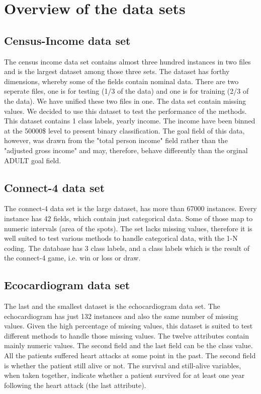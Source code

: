 \documentclass[a4paper]{article}
\begin{document}
\section{Overview of the data sets}
\subsection{Census-Income data set}
The census income data set contains almost three hundred instances in two files
and is the largest dataset among those three sets. The dataset has forthy
dimensions, whereby some of the fields contain nominal data. There are two
seperate files, one is for testing (1/3 of the data) and one is for training (2/3
of the data). We have unified these two files in one. The data set contain
missing values. We decided to use this dataset to test the performance of the
methods. This dataset contains 1 class labels, yearly income. The income have
been binned at the 50000\$ level to present binary classification. The goal field
of this data, however, was drawn from the "total person income" field rather
than the "adjusted gross income" and may, therefore, behave differently than the
orginal ADULT goal field.

\subsection{Connect-4 data set}
The connect-4 data set is the large dataset, has more than 67000 instances.
Every instance has 42 fields, which contain just categorical data. Some of those
map to numeric intervals
(area of the spots). The set lacks missing values, therefore it is well suited
to test various methods to handle categorical data, with the 1-N coding. The
database has 3 class labels, and a class labels which
is the result of the connect-4 game, i.e. win or loss or draw.

\subsection{Ecocardiogram data set}
The last and the smallest dataset is the echocardiogram data set. The
echocardiogram has just 132 instances and also the same number of missing
values. Given the high percentage of
missing values, this dataset is suited to test different methods to handle those
missing values. The twelve attributes contain mainly numeric values. The second
field and the last field can be the class value. All the patients suffered heart
attacks at some point in the past. The second field is whether the patient still
alive or not. The survival and still-alive variables, when taken together,
indicate whether a patient survived for at least one year following the heart
attack (the last attribute). 
\end{document}
